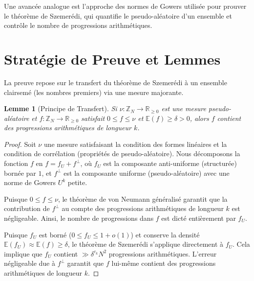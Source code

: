 \documentclass[12pt,a4paper]{article}
\newtheorem{lemma}{Lemme}
\begin{document}
Une avanc\'ee analogue est l'approche des normes de Gowers utilis\'ee pour prouver le th\'eor\`eme de Szemer\'edi, qui quantifie le pseudo-al\'eatoire d'un ensemble et contr\^ole le nombre de progressions arithm\'etiques.

\section{Strat\'egie de Preuve et Lemmes}

La preuve repose sur le transfert du th\'eor\`eme de Szemer\'edi \`a un ensemble clairsem\'e (les nombres premiers) via une mesure majorante.

\begin{lemma}[Principe de Transfert]
Si $\nu: \mathbb{Z}_N \to \mathbb{R}_{\geq 0}$ est une mesure pseudo-al\'eatoire et $f: \mathbb{Z}_N \to \mathbb{R}_{\geq 0}$ satisfait $0 \leq f \leq \nu$ et $\mathbb{E}(f) \geq \delta > 0$, alors $f$ contient des progressions arithm\'etiques de longueur $k$.
\end{lemma}
\begin{proof}
Soit $\nu$ une mesure satisfaisant la condition des formes lin\'eaires et la condition de corr\'elation (propri\'et\'es de pseudo-al\'eatoire). Nous d\'ecomposons la fonction $f$ en $f = f_{U} + f^{\perp}$, o\`u $f_{U}$ est la composante anti-uniforme (structur\'ee) born\'ee par $1$, et $f^{\perp}$ est la composante uniforme (pseudo-al\'eatoire) avec une norme de Gowers $U^k$ petite.

Puisque $0 \leq f \leq \nu$, le th\'eor\`eme de von Neumann g\'en\'eralis\'e garantit que la contribution de $f^{\perp}$ au compte des progressions arithm\'etiques de longueur $k$ est n\'egligeable. Ainsi, le nombre de progressions dans $f$ est dict\'e enti\`erement par $f_{U}$.

Puisque $f_{U}$ est born\'e ($0 \leq f_{U} \leq 1 + o(1)$) et conserve la densit\'e $\mathbb{E}(f_{U}) \approx \mathbb{E}(f) \geq \delta$, le th\'eor\`eme de Szemer\'edi s'applique directement \`a $f_{U}$. Cela implique que $f_{U}$ contient $\gg \delta^{c_k} N^2$ progressions arithm\'etiques. L'erreur n\'egligeable due \`a $f^{\perp}$ garantit que $f$ lui-m\^eme contient des progressions arithm\'etiques de longueur $k$.
\end{proof}
\end{document}
